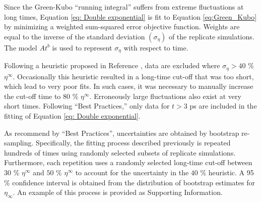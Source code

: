 \documentclass[preprint,review,12pt]{elsarticle}
\begin{document}
	Since the Green-Kubo ``running integral'' suffers from extreme fluctuations at long times, Equation \ref{eq: Double exponential} is fit to Equation \ref{eq:Green_Kubo} by minimizing a weighted sum-squared error objective function. Weights are equal to the inverse of the standard deviation $(\sigma_{\eta})$ of the replicate simulations. The model $A t^{b}$ is used to represent $\sigma_{\eta}$ with respect to time. 
	
	Following a heuristic proposed in Reference , data are excluded where $\sigma_{\eta} > 40$ \% $\eta^{\infty}$. Occasionally this heuristic resulted in a long-time cut-off that was too short, which lead to very poor fits. In such cases, it was necessary to manually increase the cut-off time to $80$ \% $\eta^{\infty}$. Erroneously large fluctuations also exist at very short times. Following ``Best Practices,'' only data for $t > 3$ ps are included in the fitting of Equation \ref{eq: Double exponential}. 
	 
	
	As recommend by ``Best Practices'', uncertainties are obtained by bootstrap re-sampling. Specifically, the fitting process described previously is repeated hundreds of times using randomly selected subsets of replicate simulations. Furthermore, each repetition uses a randomly selected long-time cut-off between $30$ \% $\eta^{\infty}$ and $50$ \% $\eta^{\infty}$ to account for the uncertainty in the $40$ \% heuristic. A 95 \% confidence interval is obtained from the distribution of bootstrap estimates for $\eta_\infty$. An example of this process is provided as Supporting Information.
	
	
\end{document}
